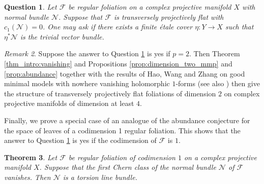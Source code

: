 \documentclass[english,10pt]{amsart}
\newcommand{\cF}{\mathcal{F}}
\newcommand{\sN}{\mathscr{N}}
\newtheorem{thm}{Theorem}[section]
\newtheorem{question}[thm]{Question}
\theoremstyle{definition}
\theoremstyle{remark}
\newtheorem{rem}[thm]{Remark}
\numberwithin{equation}{section}
\begin{document}
\begin{question}\label{question:abundance}
Let $\cF$ be regular foliation on a complex projective manifold $X$ with normal bundle $\sN$. Suppose that $\cF$ is transversely projectively flat with $c_1(\sN)=0$. One may ask if there exists a finite \'etale cover $\eta\colon Y \to X$ such that $\eta^* \sN$ is the trivial vector bundle. 
\end{question}

\begin{rem}
Suppose the answer to Question \ref{question:abundance} is yes if $p=2$. Then Theorem \ref{thm_intro:vanishing} and Propositions \ref{prop:dimension_two_mmp} and \ref{prop:abundance} together with the results of Hao, Wang and Zhang \cite{hao_al} on good minimal models with nowhere vanishing holomorphic $1$-forms (see also \cite{church}) then give the structure of transversely projectively flat foliations of dimension $2$ on complex projective manifolds of dimension at least $4$.
\end{rem}

Finally, we prove a special case of an analogue of the abundance conjecture for the space of leaves of a codimension 1 regular foliation. This shows that the answer to Question \ref{question:abundance} is yes if the codimension of $\cF$ is $1$.

\begin{thm}
Let $\cF$ be regular foliation of codimension $1$ on a complex projective manifold $X$. Suppose that the first Chern class of the normal bundle $\sN$ of $\cF$ vanishes. Then $\sN$ is a torsion line bundle.
\end{thm}
\end{document}
